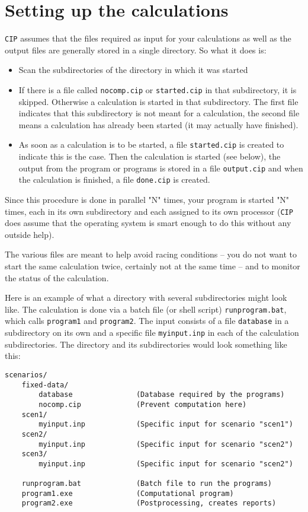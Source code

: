 \documentclass[onecolumn]{article}
\begin{document}
\section{Setting up the calculations}
\verb+CIP+ assumes that the files required as input for your
calculations as well as the output files are generally stored in a
single directory. So what it does is:
\begin{itemize}
\item
Scan the subdirectories of the directory in which it was started
\item
If there is a file called \verb+nocomp.cip+ or \verb+started.cip+ in
that subdirectory, it is skipped. Otherwise a calculation is started
in that subdirectory. The first file indicates that this subdirectory
is not meant for a calculation, the second file means a calculation
has already been started (it may actually have finished).
\item
As soon as a calculation is to be started, a file \verb+started.cip+
is created to indicate this is the case. Then the calculation is
started (see below), the output from the program or programs is stored
in a file \verb+output.cip+ and when the calculation is finished, a
file \verb+done.cip+ is created.
\end{itemize}

Since this procedure is done in parallel "N" times, your program is
started "N" times, each in its own subdirectory and each assigned to
its own processor (\verb+CIP+ does assume that the operating system is
smart enough to do this without any outside help).

The various files are meant to help avoid racing conditions -- you do
not want to start the same calculation twice, certainly not at the
same time -- and to monitor the status of the calculation.

Here is an example of what a directory with several subdirectories
might look like. The calculation is done via a batch file (or shell
script) \verb+runprogram.bat+, which calls \verb+program1+ and
\verb+program2+. The input consists of a file \verb+database+ in a
subdirectory on its own and a specific file \verb+myinput.inp+ in each
of the calculation subdirectories. The directory and its
subdirectories would look something like this:

\begin{verbatim}
scenarios/
    fixed-data/
        database               (Database required by the programs)
        nocomp.cip             (Prevent computation here)
    scen1/
        myinput.inp            (Specific input for scenario "scen1")
    scen2/
        myinput.inp            (Specific input for scenario "scen2")
    scen3/
        myinput.inp            (Specific input for scenario "scen2")

    runprogram.bat             (Batch file to run the programs)
    program1.exe               (Computational program)
    program2.exe               (Postprocessing, creates reports)
\end{verbatim}
\end{document}
